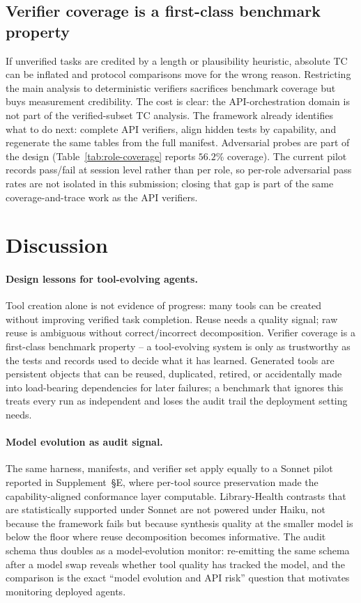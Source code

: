 \documentclass[sigconf,anonymous,review,natbib=false]{acmart}
\begin{document}
\subsection{Verifier coverage is a first-class benchmark property}

If unverified tasks are credited by a length or plausibility heuristic, absolute TC can be inflated and protocol comparisons move for the wrong reason. Restricting the main analysis to deterministic verifiers sacrifices benchmark coverage but buys measurement credibility. The cost is clear: the API-orchestration domain is not part of the verified-subset TC analysis. The framework already identifies what to do next: complete API verifiers, align hidden tests by capability, and regenerate the same tables from the full manifest. Adversarial probes are part of the design (Table~\ref{tab:role-coverage} reports $56.2$\% coverage). The current pilot records pass/fail at session level rather than per role, so per-role adversarial pass rates are not isolated in this submission; closing that gap is part of the same coverage-and-trace work as the API verifiers.

\section{Discussion}

\paragraph{Design lessons for tool-evolving agents.}
Tool creation alone is not evidence of progress: many tools can be created without improving verified task completion. Reuse needs a quality signal; raw reuse is ambiguous without correct/incorrect decomposition. Verifier coverage is a first-class benchmark property -- a tool-evolving system is only as trustworthy as the tests and records used to decide what it has learned. Generated tools are persistent objects that can be reused, duplicated, retired, or accidentally made into load-bearing dependencies for later failures; a benchmark that ignores this treats every run as independent and loses the audit trail the deployment setting needs.

\paragraph{Model evolution as audit signal.}
\label{sec:model-evo}
The same harness, manifests, and verifier set apply equally to a Sonnet pilot reported in Supplement~\S E, where per-tool source preservation made the capability-aligned conformance layer computable. Library-Health contrasts that are statistically supported under Sonnet are not powered under Haiku, not because the framework fails but because synthesis quality at the smaller model is below the floor where reuse decomposition becomes informative. The audit schema thus doubles as a model-evolution monitor: re-emitting the same schema after a model swap reveals whether tool quality has tracked the model, and the comparison is the exact ``model evolution and API risk'' question that motivates monitoring deployed agents.
\end{document}
